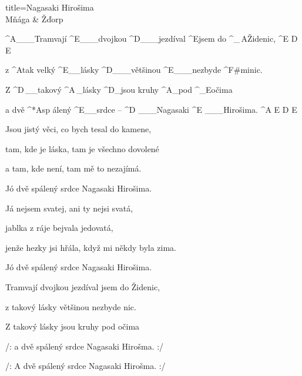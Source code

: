 \begin{song}{title=\predtitle\centering Nagasaki Hirošima \\\large Mňága \&  Žďorp  \vspace*{-0.3cm}}  %
\begin{centerjustified}
\nejnejvetsi

\sloka
	^{A{\color{white}\_\_\_}}Tramvají ^{E{\color{white}\_\_\_}}dvojkou ^{D{\color{white}\_\_\_}}jezdíval ^{E}jsem do ^{{\color{white}\_}\,A}Židenic, ^{E\,\,D\,\,E}

	z ^{A}tak velký ^{E{\color{white}\_\_}}lásky ^{D{\color{white}\_\_\_}}většinou ^{E{\color{white}\_\_\_}}nezbyde ^{F#mi}nic.

	Z ^{D\,{\color{white}\_\_}}takový ^{A\,{\color{white}\_}}lásky ^{D{\color{white}\_}}jsou kruhy ^{A{\color{white}\_}}pod ^{{\color{white}\_}E}očima

	a dvě ^*{A}sp álený ^{E{\color{white}\_\_}}srdce -- ^{D\,\,{\color{white}\_\_\_}}Nagasaki ^{E\,\,{\color{white}\_\_\_}}Hirošima. ^{A\,\,E\,\,D\,\,E}

\sloka
	Jsou jistý věci, co bych tesal do kamene,
	
	tam, kde je láska, tam je všechno dovolené
	
	a tam, kde není, tam mě to nezajímá.
	
	Jó dvě spálený srdce Nagasaki Hirošima.

\sloka
	Já nejsem svatej, ani ty nejsi svatá,
	
	jablka z ráje bejvala jedovatá,
	
	jenže hezky jsi hřála, když mi někdy byla zima.
	
	Jó dvě spálený srdce Nagasaki Hirošima.

\sloka
	Tramvají dvojkou jezdíval jsem do Židenic,
	
	z takový lásky většinou nezbyde nic.
	
	Z takový lásky jsou kruhy pod očima

	/: a dvě spálený srdce Nagasaki Hirošma. :/
	
	/: A dvě spálený srdce Nagasaki Hirošma. :/

\end{centerjustified}
\setcounter{Slokočet}{0}
\end{song}


